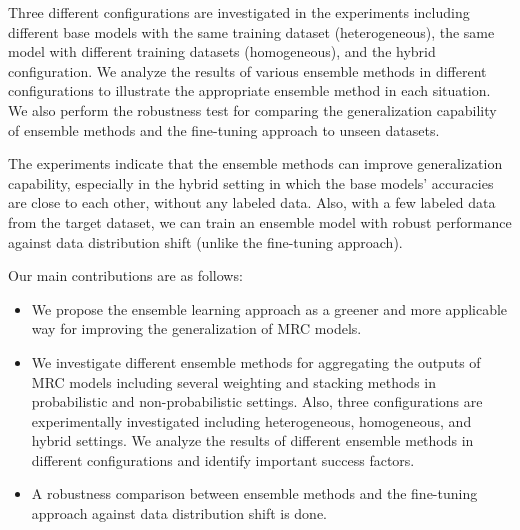 \documentclass[review]{elsarticle}
\begin{document}
Three different configurations are investigated in the experiments including different base models with the same training dataset (heterogeneous), the same model with different training datasets (homogeneous), and the hybrid configuration. 
We analyze the results of various ensemble methods in different configurations to illustrate the appropriate ensemble method in each situation. 
We also perform the robustness test for comparing the generalization capability of ensemble methods and the fine-tuning approach to unseen datasets.

The experiments indicate that the ensemble methods can improve generalization capability, especially in the hybrid setting in which the base models' accuracies are close to each other, without any labeled data. Also, with a few labeled data from the target dataset, we can train an ensemble model with robust performance against data distribution shift (unlike the fine-tuning approach).

 
Our main contributions are as follows:
\begin{itemize}
\item We propose the ensemble learning approach as a greener and more applicable way for improving the generalization of MRC models.
\item We investigate different ensemble methods for aggregating the outputs of MRC models including several weighting and stacking methods in probabilistic and non-probabilistic settings. Also, three configurations are experimentally investigated including heterogeneous, homogeneous, and hybrid settings. We analyze the results of different ensemble methods in different configurations and identify important success factors.
\item A robustness comparison between ensemble methods and the fine-tuning approach against data distribution shift is done.
\end{itemize}
\end{document}
